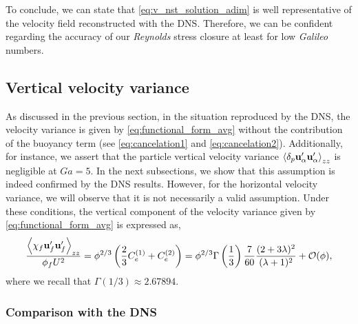 To conclude, we can state that \ref{eq:v_nst_solution_adim} is well representative of the velocity field reconstructed with the DNS. 
Therefore, we can be confident regarding the accuracy of our \textit{Reynolds} stress closure at least for low \textit{Galileo} numbers. 




\subsection{Vertical velocity variance}

As discussed in the previous section, in the situation reproduced by the DNS, the velocity variance is given by \ref{eq:functional_form_avg} without the contribution of the buoyancy term (see \eqref{eq:cancelation1} and \ref{eq:cancelation2}). 
Additionally, for instance, we assert that the particle vertical velocity variance $\left<\delta_p \textbf{u}_\alpha'\textbf{u}_\alpha'\right>_{zz}$ is negligible  at  $Ga =5$. 
In the next subsections, we show that this assumption is indeed confirmed by the DNS results. 
However, for the horizontal velocity variance, we will observe that it is not necessarily a valid assumption. 
Under these conditions, the vertical component of the velocity variance given by \ref{eq:functional_form_avg} is expressed as, 
\begin{equation}
    \frac{\avg{\chi_f \textbf{u}_f'\textbf{u}_f'}_{zz}}{\phi_f U^2}
    = \phi^{2/3} \left(
        \frac{2}{3}C_e^{(1)}+ C_e^{(2)}
    \right)
    = 
    \phi^{2/3}\Gamma\left(\frac{1}{3}\right) \frac{7}{60}\frac{(2+3\lambda)^2 }{(\lambda+1)^2}
    + \mathcal{O}(\phi), 
    \label{eq:theoritical_simplified}
\end{equation}
where we recall that $\Gamma(1/3) \approx 2.67894$. 




\subsubsection{Comparison with the DNS}

